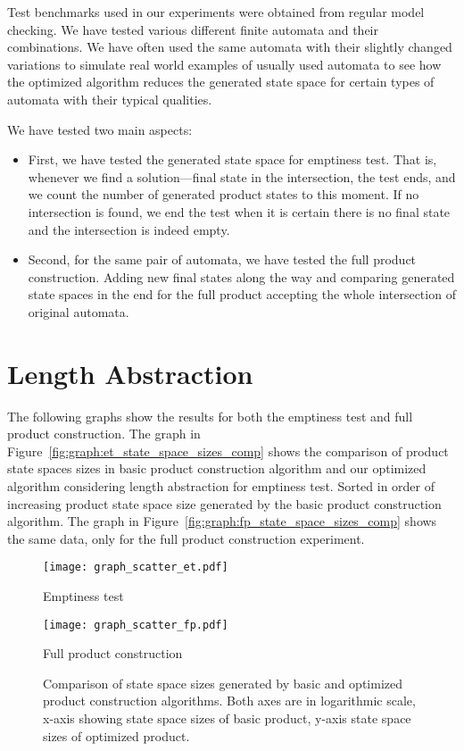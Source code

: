 Test benchmarks used in our experiments were obtained from regular model checking. We have tested various different finite automata and their combinations. We have often used the same automata with their slightly changed variations to simulate real world examples of usually used automata to see how the optimized algorithm reduces the generated state space for certain types of automata with their typical qualities.

We have tested two main aspects:
\begin{itemize}
    \item First, we have tested the generated state space for emptiness test. That is, whenever we find a solution---final state in the intersection, the test ends, and we count the number of generated product states to this moment. If no intersection is found, we end the test when it is certain there is no final state and the intersection is indeed empty.
    \item Second, for the same pair of automata, we have tested the full product construction. Adding new final states along the way and comparing generated state spaces in the end for the full product accepting the whole intersection of original automata.
\end{itemize}

\section{Length Abstraction}

The following graphs show the results for both the emptiness test and full product construction. The graph in Figure~\ref{fig:graph:et_state_space_sizes_comp} shows the comparison of product state spaces sizes in basic product construction algorithm and our optimized algorithm considering length abstraction for emptiness test. Sorted in order of increasing product state space size generated by the basic product construction algorithm. The graph in Figure~\ref{fig:graph:fp_state_space_sizes_comp} shows the same data, only for the full product construction experiment.

\begin{figure*}[ht]
    \centering
    \begin{minipage}{0.49\linewidth}
        \centering
        \texttt{[image: graph\_scatter\_et.pdf]}
        \caption{Emptiness test}
        \label{fig:graph:et_state_space_sizes_comp}
    \end{minipage}
    \hfill
    \begin{minipage}{0.49\linewidth}
        \centering
        \texttt{[image: graph\_scatter\_fp.pdf]}
        \caption{Full product construction}
        \label{fig:graph:fp_state_space_sizes_comp}
    \end{minipage}
    \vspace{0.5cm}
    \caption{Comparison of state space sizes generated by basic and optimized product construction algorithms. Both axes are in logarithmic scale, x-axis showing state space sizes of basic product, y-axis state space sizes of optimized product.}
    \label{fig:graph:product_state_space_sizes}
\end{figure*}

